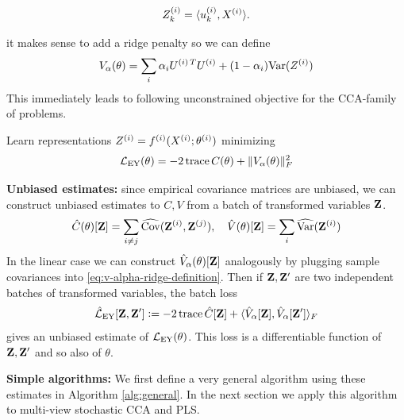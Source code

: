 \begin{equation}\label{eq:cca-linear-function-def}
Z^{(i)}_k = \langle u_k^{(i)} , X^{(i)} \rangle.
\end{equation}

it makes sense to add a ridge penalty so we can define
\begin{align}\label{eq:v-alpha-ridge-definition}
V_\alpha(\theta) = \sum_i \alpha_i {U^{(i)\,T}} U^{(i)} +  (1 - \alpha_i) \mathrm{Var}(Z^{(i)})
\end{align}
This immediately leads to following unconstrained objective for the CCA-family of problems.
\begin{definition}
    Learn representations $Z^{(i)} = f^{(i)}( X^{(i)}; \theta^{(i)})$ minimizing
    \begin{align}\label{eq:EY-loss-def-C-V}
    \mathcal{L}_\text{EY}(\theta) = - 2 \operatorname{trace} C(\theta) + \lVert V_\alpha(\theta)\rVert_F^2
    \end{align}
\end{definition}

\textbf{Unbiased estimates:}
since empirical covariance matrices are unbiased, we can construct unbiased estimates to $C, V$ from a batch of transformed variables $\mathbf{Z}$.
\begin{align}\label{eq:def-C-V-matrices-empirical}
\hat{C}(\theta)[\mathbf{Z}] = \sum_{i \neq j} \widehat{\mathrm{Cov}}(\mathbf{Z}^{(i)}, \mathbf{Z}^{(j)}), \quad
\hat{V}(\theta)[\mathbf{Z}] = \sum_{i} \widehat{\mathrm{Var}}(\mathbf{Z}^{(i)})
\end{align}
In the linear case we can construct $\hat{V}_\alpha(\theta)[\mathbf{Z}]$ analogously by plugging sample covariances into \cref{eq:v-alpha-ridge-definition}.
Then if $\mathbf{Z}, \mathbf{Z}'$ are two independent batches of transformed variables, the batch loss
\begin{align}\label{eq:empirical-EY-loss-estimate-def}
\hat{\mathcal{L}}_\text{EY}[\mathbf{Z}, \mathbf{Z}'] \vcentcolon= - 2 \operatorname{trace} \hat{C}[\mathbf{Z}] + \langle \hat{V}_\alpha[\mathbf{Z}], \hat{V}_\alpha[\mathbf{Z}'] \rangle_F
\end{align}
gives an unbiased estimate of $\mathcal{L}_\text{EY}(\theta)$.
This loss is a differentiable function of $\mathbf{Z}, \mathbf{Z}'$ and so also of $\theta$.

\textbf{Simple algorithms:}
We first define a very general algorithm using these estimates in Algorithm \ref{alg:general}.
In the next section we apply this algorithm to multi-view stochastic CCA and PLS.

